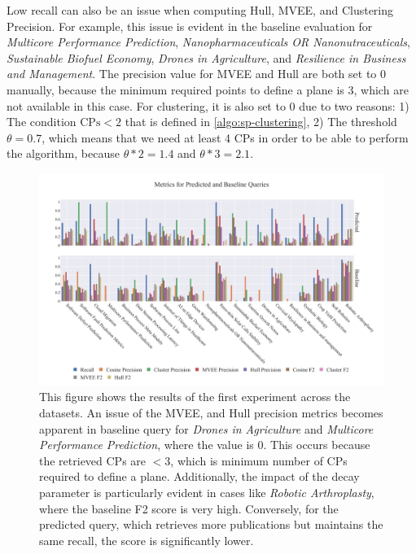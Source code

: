 Low recall can also be an issue when computing Hull, MVEE, and Clustering Precision. For example, this issue is evident in the baseline evaluation for \textit{Multicore Performance Prediction}, \textit{Nanopharmaceuticals OR Nanonutraceuticals}, \textit{Sustainable Biofuel Economy}, \textit{Drones in Agriculture}, and \textit{Resilience in Business and Management}. The precision value for MVEE and Hull are both set to 0 manually, because the minimum required points to define a plane is 3, which are not available in this case. For clustering, it is also set to 0 due to two reasons: 1) The condition $\text{CPs} < 2$ that is defined in \autoref{algo:sp-clustering},
2) The threshold $\theta = 0.7$, which means that we need at least 4 CPs in order to be able to perform the algorithm, because $ \theta * 2 = 1.4 $ and $ \theta * 3 = 2.1 $.

\begin{figure}[!h]
	\hspace*{-1cm}	
	\includegraphics[scale=0.45]{pics/all-metrics-1.pdf}
	\caption[Evaluation: Experiment 1]{This figure shows the results of the first experiment across the datasets. An issue of the MVEE, and Hull precision metrics becomes apparent in baseline query for \textit{Drones in Agriculture} and \textit{Multicore Performance Prediction}, where the value is 0. This occurs because the retrieved CPs are $<3$, which is minimum number of CPs required to define a plane. Additionally, the impact of the decay parameter is particularly evident in cases like \textit{Robotic Arthroplasty}, where the baseline F2 score is very high. Conversely, for the predicted query, which retrieves more publications but maintains the same recall, the score is significantly lower.}\label{fig:all-metrics-1}
\end{figure}

